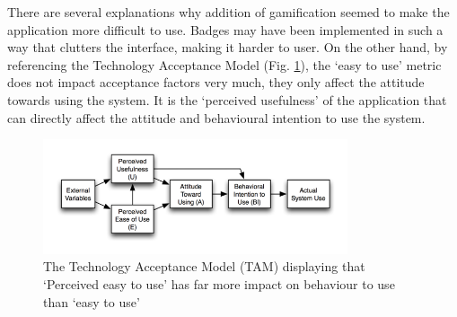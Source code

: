 	There are several explanations why addition of gamification seemed to make the application more difficult to use. Badges may have been implemented in such a way that clutters the interface, making it harder to user. On the other hand, by referencing the Technology Acceptance Model (Fig. \ref{fig:TAMagain}), the `easy to use' metric does not impact acceptance factors very much, they only affect the attitude towards using the system.  It is the `perceived usefulness' of the application that can directly affect the attitude and behavioural intention to use the system.
    \begin{figure}[H]
 \centering
  \includegraphics[width=0.80\textwidth]{img/TAM.png}
     \caption{The Technology Acceptance Model (TAM) displaying that `Perceived easy to use' has far more impact on behaviour to use than `easy to use'}
     \label{fig:TAMagain}
\end{figure}
    
